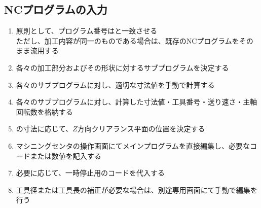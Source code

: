 \subsection{NCプログラムの入力}
\begin{enumerate}[label=\sarrow]
\item 原則として、プログラム番号は\DrawingExists と一致させる\\
ただし、加工内容が同一のものである場合は、既存のNCプログラムをそのまま流用する
\item 各々の加工部分およびその形状に対するサブプログラムを決定する
\item 各々のサブプログラムに対し、適切な寸法値を手動で計算する
\item 各々のサブプログラムに対し、計算した寸法値・工具番号・送り速さ・主軸回転数を格納する
\item \ReAlocationLength の寸法に応じて、$Z$方向クリアランス平面の位置を決定する
\item マシニングセンタの操作画面にてメインプログラムを直接編集し、必要なコードまたは数値を記入する
\item 必要に応じて、一時停止用のコードを代入する
\item {}工具径または工具長の補正が必要な場合は、別途専用画面にて手動で編集を行う
\end{enumerate}


